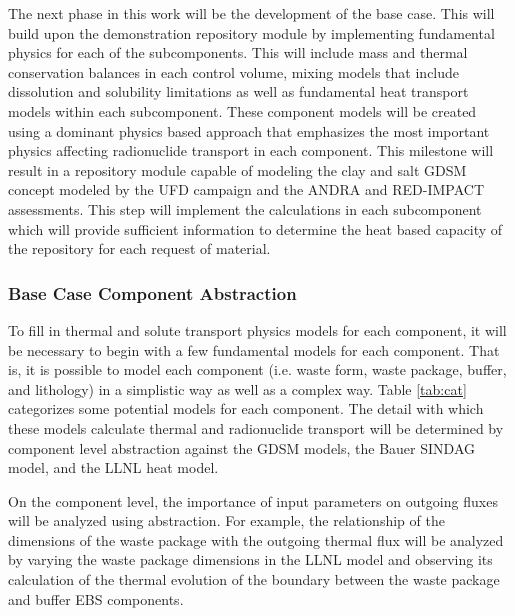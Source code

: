 
The next phase in this work will be the development of the base case.  This 
will build upon the demonstration repository module by implementing fundamental
physics for each of the subcomponents.  This will include mass and thermal 
conservation balances in each control volume, mixing models that include 
dissolution and solubility limitations as well as fundamental heat transport
models within each subcomponent. These component models will be created using a 
dominant physics based approach that emphasizes the most important physics 
affecting radionuclide transport in each component. This milestone will result 
in a repository module capable of modeling the clay and salt \gls{GDSM} concept 
modeled by the \gls{UFD} campaign and the \gls{ANDRA} and RED-IMPACT  assessments.
This step will implement the calculations in each subcomponent which 
will provide sufficient information to determine the heat based capacity of 
the repository for each request of material. 

\subsubsection{Base Case Component Abstraction}


To fill in thermal and solute transport physics models for each component, it 
will be necessary to begin with a few fundamental models for each component. 
That is, it is possible to model each component (i.e. waste form, waste package, 
buffer, and lithology) in a simplistic way as well as a complex way. Table 
\ref{tab:cat} categorizes some potential models for each component. The detail 
with which these models calculate thermal and radionuclide transport will be 
determined by component level abstraction against the \gls{GDSM} models, the 
Bauer \gls{SINDAG} model, and the \gls{LLNL} heat model.


  


On the component level, the importance of input parameters on outgoing fluxes 
will be analyzed using abstraction. For example, the relationship of the 
dimensions  of the waste package with the outgoing thermal flux 
will be analyzed by varying the waste package dimensions in the \gls{LLNL} 
model and observing its calculation of the thermal evolution of the boundary 
between the waste package and buffer \gls{EBS} components.

